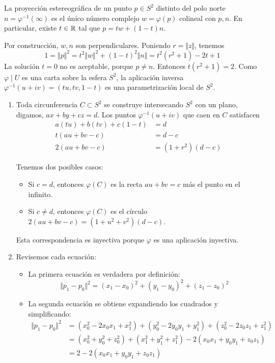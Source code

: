 \begin{solution}
La proyección estereográfica de un punto $p \in S^2$ distinto del polo norte $n = \varphi^{-1}(\infty)$ es el único número complejo $w = \varphi(p)$ colineal con $p, n$. En particular, existe $t \in \mathbb R$ tal que $p = tw + (1-t)n$.

Por construcción, $w, n$ son perpendiculares. Poniendo $r = \Vert z \Vert$, tenemos
$$1 = \Vert p \Vert^2 = t^2 \Vert w \Vert^2 + (1-t)^2 \Vert n \Vert = t^2 (r^2 + 1) - 2t + 1$$
La solución $t = 0$ no es aceptable, porque $p \ne n$. Entonces $t (r^2 + 1) = 2$. Como $\varphi \mid U$ es una carta sobre la esfera $S^2$, la aplicación inversa $\varphi^{-1}(u + iv) = (tu, tv, 1-t)$ es una parametrización local de $S^2$.

\begin{enumerate}[label=(\alph*)]
    \item Toda circunferencia $C \subset S^2$ se construye intersecando $S^2$ con un plano, digamos, $ax + by + cz = d$. Los puntos $\varphi^{-1}(u + iv)$ que caen en $C$ satisfacen
    \begin{align*}
        a(tu) + b(tv) + c(1-t) & = d \\
        t (au + bv - c) & = d - c \\
        2 (au + bv - c) & = (1 + r^2) (d-c)
    \end{align*}
    
    Tenemos dos posibles casos:
    \begin{itemize}
        \item Si $c = d$, entonces $\varphi(C)$ es la recta $au + bv = c$ más el punto en el infinito.
        \item Si $c \ne d$, entonces $\varphi(C)$ es el círculo $2 (au + bv - c) = (1 + u^2 + v^2) (d-c)$.
    \end{itemize}
    
    Esta correspondencia es inyectiva porque $\varphi$ es una aplicación inyectiva.
    
    \item Revisemos cada ecuación:
    \begin{itemize}
        \item La primera ecuación es verdadera por definición:
        $$\Vert p_1 - p_0 \Vert^2 = (x_1 - x_0)^2 + (y_1 - y_0)^2 + (z_1 - z_0)^2$$
        
        \item La segunda ecuación se obtiene expandiendo los cuadrados y simplificando:
        \begin{align*}
            \Vert p_1 - p_0 \Vert^2
                & = (x_0^2 - 2 x_0 x_1 + x_1^2) + (y_0^2 - 2 y_0 y_1 + y_1^2) + (z_0^2 - 2 z_0 z_1 + z_1^2) \\
                & = (x_0^2 + y_0^2 + z_0^2) + (x_1^2 + y_1^2 + z_1^2) - 2 (x_0 x_1 + y_0 y_1 + z_0 z_1) \\
                & = 2 - 2 (x_0 x_1 + y_0 y_1 + z_0 z_1)
        \end{align*}
        

\end{itemize}
\end{enumerate}
\end{solution}
